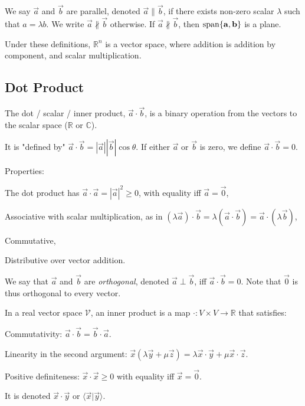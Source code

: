\documentclass[12pt]{article}
\begin{document}
We say $\vec{a}$ and $\vec{b}$ are parallel,
denoted $\vec{a}\parallel\vec{b}$, if there exists non-zero scalar $\lambda $
such that $a = \lambda b$.
We write $\vec a \nparallel \vec b$ otherwise.
If $\vec a \nparallel \vec b$, then $\operatorname{span}\{\mathbf{a}, \mathbf{b}\}$ is a plane.

Under these definitions, $\mathbb{R}^{n}$ is a vector space,
where addition is addition by component, and scalar multiplication.

\subsection{Dot Product}

The dot / scalar / inner product,
$\vec{a}\cdot\vec{b}$,
is a binary operation from the vectors
to the scalar space ($\mathbb{R}$ or $\mathbb{C}$).

It is "defined by" $\vec{a}\cdot\vec{b} = |\vec{a}||\vec{b}|\cos\theta$.
If either $\vec{a}$ or $\vec{b}$ is zero, we define $\vec{a}\cdot\vec{b}=0$.

Properties:
\begin{compactitem}
\item The dot product has $\vec{a}\cdot\vec{a}=|\vec{a}|^{2}\ge 0$,
    with equality iff $\vec{a}=\vec{0}$,
\item Associative with scalar multiplication, as in
    $(\lambda \vec{a})\cdot\vec{b}=\lambda (\vec{a}\cdot\vec{b}) = \vec{a}\cdot(\lambda \vec{b})$,
\item Commutative,
\item Distributive over vector addition.
\end{compactitem}

We say that $\vec{a}$ and $\vec{b}$ are \emph{orthogonal},
denoted $\vec{a}\perp\vec{b}$, iff $\vec{a}\cdot\vec{b}=0$.
Note that $\vec{0}$ is thus orthogonal to every vector.

\begin{definition}
    In a real vector space $\mathcal{V}$,
    an inner product is a map $\cdot : V \times V \to \mathbb{R}$
    that satisfies:
    \begin{compactenum}[(i)]
    \item Commutativity: $\vec{a}\cdot\vec{b} = \vec{b}\cdot\vec{a}$.
    \item Linearity in the second argument: $\vec{x}(\lambda \vec{y}+\mu \vec{z}) = \lambda \vec{x}\cdot\vec{y}+\mu \vec{x}\cdot\vec{z}$.
    \item Positive definiteness: $\vec{x}\cdot\vec{x} \ge 0$ with equality iff $\vec{x}=\vec{0}$.
    \end{compactenum}
    It is denoted $\vec{x}\cdot\vec{y}$ or $\langle\vec{x}|\vec{y}\rangle$.
\end{definition}
\end{document}
